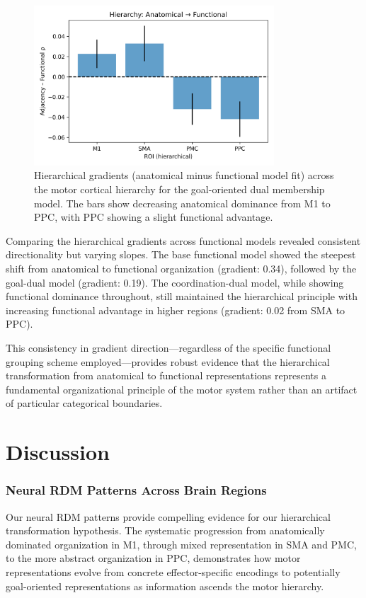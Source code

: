 \documentclass{article}
\begin{document}
\begin{figure}[!htbp]
\centering
\includegraphics[width=0.8\textwidth]{results/goal_dual/hierarchy_adjacency_vs_functional.png}
\caption{Hierarchical gradients (anatomical minus functional model fit) across the motor cortical hierarchy for the goal-oriented dual membership model. The bars show decreasing anatomical dominance from M1 to PPC, with PPC showing a slight functional advantage.}
\label{fig:hierarchy_gradients}
\end{figure}

Comparing the hierarchical gradients across functional models revealed consistent directionality but varying slopes. The base functional model showed the steepest shift from anatomical to functional organization (gradient: 0.34), followed by the goal-dual model (gradient: 0.19). The coordination-dual model, while showing functional dominance throughout, still maintained the hierarchical principle with increasing functional advantage in higher regions (gradient: 0.02 from SMA to PPC).

This consistency in gradient direction—regardless of the specific functional grouping scheme employed—provides robust evidence that the hierarchical transformation from anatomical to functional representations represents a fundamental organizational principle of the motor system rather than an artifact of particular categorical boundaries.

\section{Discussion}
\subsubsection{Neural RDM Patterns Across Brain Regions}
Our neural RDM patterns provide compelling evidence for our hierarchical transformation hypothesis. The systematic progression from anatomically dominated organization in M1, through mixed representation in SMA and PMC, to the more abstract organization in PPC, demonstrates how motor representations evolve from concrete effector-specific encodings to potentially goal-oriented representations as information ascends the motor hierarchy.
\end{document}
